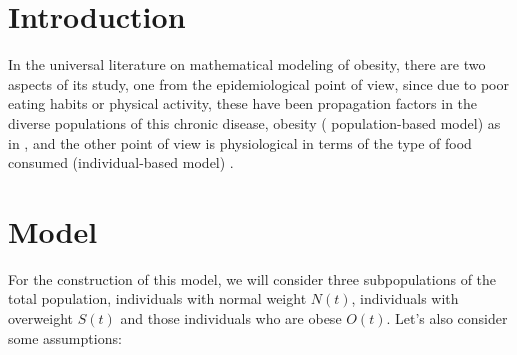 	
	
	
	
	

	
	\section{Introduction}

	

	In the universal literature on mathematical modeling of obesity, there are two aspects of its study, one from the epidemiological point of view, since due to poor eating habits or physical activity, these have been propagation factors in the diverse populations of this chronic disease, obesity ( population-based model) as in \cite{ar}, \cite{ev} and the other point of view is physiological in terms of the type of food consumed (individual-based model) \cite{ff}\cite{lo}.

	

	\section{Model}
	For the construction of this model, we will consider three subpopulations of the total population, individuals with normal weight $N(t)$, individuals with overweight $S(t)$ and those individuals who are obese $O(t)$. Let's also consider some assumptions:



	\medskip
		
